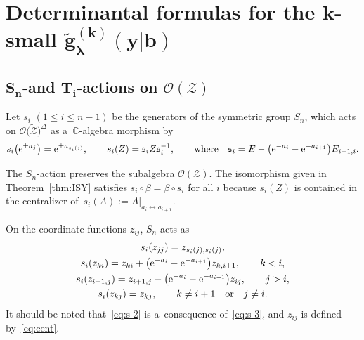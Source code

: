 \documentclass[10pt,a4paper]{amsart}
\numberwithin{equation}{section}
\newcommand{\la}{\lambda}
\newcommand{\reg}{\Delta}
\newcommand{\Rep}{{R(T)}}
\def\CC{\mathord{\mathbb{C}}}
\theoremstyle{definition}
\begin{document}
\section[Determinantal formulas for the k-small g\_la\^{}(k)(y|b)]{Determinantal formulas for the $\boldsymbol{k}$-small $\boldsymbol{\tilde{g}_\la^{(k)}(y|b)}$}\label{sec:det}

\subsection[S\_n-and T\_i-actions on O(Z)]{$\boldsymbol{S_n}$-and $\boldsymbol{T_i}$-actions on $\boldsymbol{\mathscr{O}(\mathscr{Z})}$}

Let $s_i$ $(1\le i\le n-1)$ be the generators of the symmetric group $S_n$, which acts on $\mathscr{O}\bigl(\tilde{\mathscr{Z}}\bigr)^{\reg}$ as a~$\CC$-algebra morphism by
\[
s_i\bigl({\rm e}^{\pm a_j}\bigr)={\rm e}^{\pm a_{s_i(j)}},\qquad
s_i(Z)=\mathfrak{s}_iZ\mathfrak{s}_i^{-1},
\qquad \mbox{where} \quad \mathfrak{s}_i=E-\bigl({\rm e}^{-a_i}-{\rm e}^{-a_{i+1}}\bigr)E_{i+1,i}.
\]

The $S_n$-action preserves the subalgebra $\mathscr{O}({\mathscr{Z}})$.
The isomorphism \smash{$\beta\colon\mathscr{O}(\mathscr{Z})\to \hat{\Lambda}_{(n)}^\Rep$} given in Theorem~\ref{thm:ISY} satisfies $s_i\circ\beta=\beta\circ s_i$ for all $i$ because $s_i(Z)$ is contained in the centralizer of~${s_i(A):=A|_{a_i\leftrightarrow a_{i+1}}}$.

On the coordinate functions $z_{ij}$, $S_n$ acts as
\begin{gather}
s_i(z_{jj})=z_{s_i(j),s_i(j)}\label{eq:s-2},\\
s_i(z_{ki})=z_{ki}+\bigl({\rm e}^{-a_i}-{\rm e}^{-a_{i+1}}\bigr)z_{k,i+1},\qquad k<i,\label{eq:s-3}\\
s_i(z_{i+1,j})=z_{i+1,j}-\bigl({\rm e}^{-a_i}-{\rm e}^{-a_{i+1}}\bigr)z_{ij},\qquad j>i,\label{eq:s-4}\\
s_i(z_{kj})=z_{kj},\qquad
k\ne i+1 \quad\text{or}\quad j\ne i.
\label{eq:s-5}
\end{gather}
It should be noted that~\eqref{eq:s-2} is a~consequence of~\eqref{eq:s-3}, and $z_{ij}$ is defined by~\eqref{eq:cent}.
\end{document}

